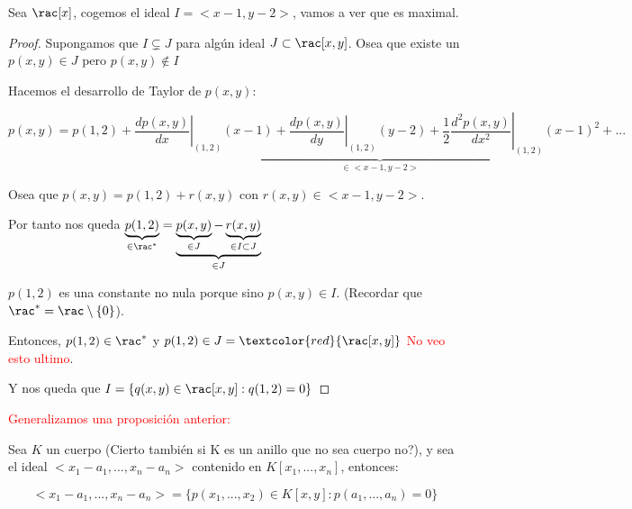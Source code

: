 \begin{example}
Sea $\rac[x]$, cogemos el ideal $I=<x-1,y-2>$, vamos a ver que es maximal.

\begin{proof}
	Supongamos que $I \subsetneq J$ para algún ideal $J \subset \rac[x,y]$. Osea que existe un $p(x,y) \in J$ pero $p(x,y) \notin I$

	Hacemos el desarrollo de Taylor de $p(x,y)$:

	$$ p(x,y)=p(1,2) + \underbrace{\left.\frac{d p(x,y)}{dx}\right|_{(1,2)} (x-1)+ \left.\frac{d p(x,y)}{dy}\right|_{(1,2)} (y-2)+\frac{1}{2}\left.\frac{d^2 p(x,y)}{dx^2}\right|_{(1,2)} (x-1)^2+...}_{\in <x-1,y-2>}$$

	Osea que $p(x,y)=p(1,2)+r(x,y)$ con $r(x,y) \in <x-1,y-2>$.

	Por tanto nos queda $\underbrace{p(1,2)}_{\in \rac^*}=\underbrace{\underbrace{p(x,y)}_{\in J}-\underbrace{r(x,y)}_{\in I \subset J}}_{\in J}$

	$p(1,2)$ es una constante no nula porque sino $p(x,y) \in I$. (Recordar que $\rac^*=\rac\setminus\{0\}$).

	Entonces, $p(1,2) \in \rac^*$ y $p(1,2) \in J = \textcolor{red}{\rac[x,y]}$ \textcolor{red}{No veo esto ultimo}.

	Y nos queda que $I=\{ q(x,y) \in \rac[x,y]: q(1,2)=0 \}$
\end{proof}
\end{example}

\textcolor{red}{Generalizamos una proposición anterior:}
\begin{prop}
	Sea $K$ un cuerpo (Cierto también si K es un anillo que no sea cuerpo no?), y sea el ideal $<x_1-a_1,...,x_n-a_n>$ contenido en $K[x_1,...,x_n]$, entonces:

	$$<x_1-a_1,...,x_n-a_n>=\{p(x_1,...,x_2)\in K[x,y]:p(a_1,...,a_n)=0 \}$$
\end{prop}
